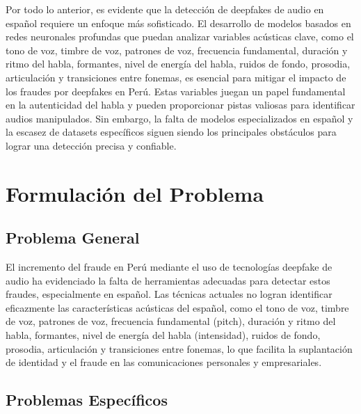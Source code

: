 Por todo lo anterior, es evidente que la detección de deepfakes de audio en español requiere un enfoque más sofisticado. El desarrollo de modelos basados en redes neuronales profundas que puedan analizar variables acústicas clave, como el tono de voz, timbre de voz, patrones de voz, frecuencia fundamental, duración y ritmo del habla, formantes, nivel de energía del habla, ruidos de fondo, prosodia, articulación y transiciones entre fonemas, es esencial para mitigar el impacto de los fraudes por deepfakes en Perú. Estas variables juegan un papel fundamental en la autenticidad del habla y pueden proporcionar pistas valiosas para identificar audios manipulados. Sin embargo, la falta de modelos especializados en español y la escasez de datasets específicos siguen siendo los principales obstáculos para lograr una detección precisa y confiable.

\section{Formulación del Problema}

\subsection{Problema General}
\newcommand{\ProblemaGeneral}{
	El incremento del fraude en Perú mediante el uso de tecnologías deepfake de audio ha evidenciado la falta de herramientas adecuadas para detectar estos fraudes, especialmente en español. Las técnicas actuales no logran identificar eficazmente las características acústicas del español, como el tono de voz, timbre de voz, patrones de voz, frecuencia fundamental (pitch), duración y ritmo del habla, formantes, nivel de energía del habla (intensidad), ruidos de fondo, prosodia, articulación y transiciones entre fonemas, lo que facilita la suplantación de identidad y el fraude en las comunicaciones personales y empresariales. 
}
\ProblemaGeneral
\subsection{Problemas Espec\'{i}ficos}
\newcommand{\Pbone}{
La falta de un dataset en español que incluya variaciones regionales y voces manipuladas dificulta el entrenamiento de modelos de redes neuronales profundas para detectar deepfakes de audio en español, debido a las diferencias en patrones de voz, frecuencia fundamental (pitch) y ritmo del habla.
}
\newcommand{\Pbtwo}{
Las técnicas actuales no logran detectar las variaciones en el tono de voz, timbre de voz y formantes en audios en español, lo que disminuye la precisión en la identificación de audios manipulados.
}
\newcommand{\Pbthree}{
Los fraudes por suplantación de identidad mediante deepfakes de audio en Perú son difíciles de detectar con las técnicas actuales debido a la falta de análisis de prosodia, articulación, transiciones entre fonemas y ruidos de fondo, lo que incrementa el riesgo de fraude.
}


